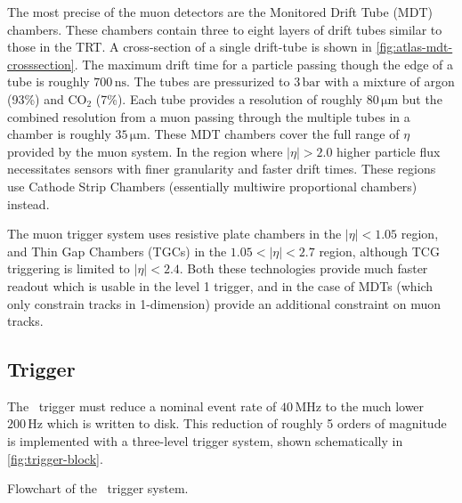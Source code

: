 The most precise of the muon detectors are the Monitored Drift Tube (MDT) chambers.
These chambers contain three to eight layers of drift tubes similar to those in the TRT.
A cross-section of a single drift-tube is shown in \cref{fig:atlas-mdt-crosssection}.
The maximum drift time for a particle passing though the edge of a tube is roughly $700\,\mathrm{ns}$.
The tubes are pressurized to $3\,\mathrm{bar}$ with a mixture of argon (93\%) and CO$_2$ (7\%).
Each tube provides a resolution of roughly $80\,\mathrm{\mu m}$ but the combined resolution from a muon passing through the multiple tubes in a chamber is roughly $35\,\mathrm{\mu m}$.
These MDT chambers cover the full range of $\eta$ provided by the muon system.
In the region where $|\eta| > 2.0$ higher particle flux necessitates sensors with finer granularity and faster drift times.
These regions use Cathode Strip Chambers (essentially multiwire proportional chambers) instead.

The muon trigger system uses resistive plate chambers in the $|\eta| < 1.05$ region, and Thin Gap Chambers (TGCs) in the $1.05 < |\eta| < 2.7$ region, although TCG triggering is limited to $|\eta| < 2.4$.
Both these technologies provide much faster readout which is usable in the level 1 trigger, and in the case of MDTs (which only constrain tracks in 1-dimension) provide an additional constraint on muon tracks.

\subsection{Trigger}
\label{sec:trigger}
The \atlas\ trigger must reduce a nominal event rate of $40\,\mathrm{MHz}$ to the much lower $200\,\mathrm{Hz}$ which is written to disk.
This reduction of roughly 5 orders of magnitude is implemented with a three-level trigger system, shown schematically in \cref{fig:trigger-block}.

\begin{cfig}
  \caption[Flowchart of the \atlas\ trigger]{Flowchart of the \atlas\ trigger system.}
  \label{fig:trigger-block}
\end{cfig}

